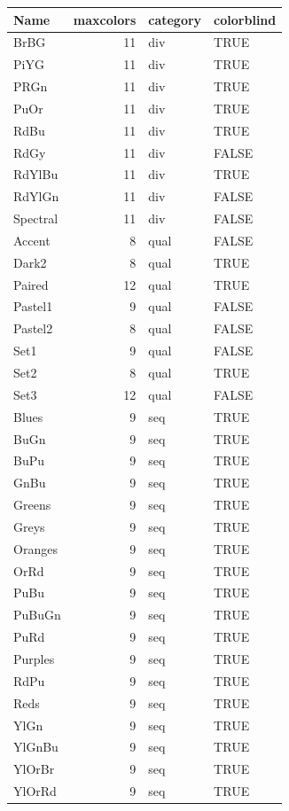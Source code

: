 \documentclass[12pt,]{book}
\makeatletter
\newenvironment{Shaded}{\begin{snugshade}}{\end{snugshade}}
\newcommand{\KeywordTok}[1]{\textcolor[rgb]{0.13,0.29,0.53}{\textbf{{#1}}}}
\newcommand{\DataTypeTok}[1]{\textcolor[rgb]{0.13,0.29,0.53}{{#1}}}
\newcommand{\StringTok}[1]{\textcolor[rgb]{0.31,0.60,0.02}{{#1}}}
\newcommand{\NormalTok}[1]{{#1}}
\newenvironment{kframe}{%
\medskip{}
\setlength{\fboxsep}{.8em}
 \def\at@end@of@kframe{}%
 \ifinner\ifhmode%
  \def\at@end@of@kframe{\end{minipage}}%
  \begin{minipage}{\columnwidth}%
 \fi\fi%
 \def\FrameCommand##1{\hskip\@totalleftmargin \hskip-\fboxsep
 \colorbox{shadecolor}{##1}\hskip-\fboxsep
     \hskip-\linewidth \hskip-\@totalleftmargin \hskip\columnwidth}%
 \MakeFramed {\advance\hsize-\width
   \@totalleftmargin\z@ \linewidth\hsize
   \@setminipage}}%
 {\par\unskip\endMakeFramed%
 \at@end@of@kframe}
\renewenvironment{Shaded}{\begin{kframe}}{\end{kframe}}
\makeatother
\begin{document}
\begin{Shaded}
\end{Shaded}

\begin{tabular}{l|r|l|l}
\hline
Name & maxcolors & category & colorblind\\
\hline
BrBG & 11 & div & TRUE\\
\hline
PiYG & 11 & div & TRUE\\
\hline
PRGn & 11 & div & TRUE\\
\hline
PuOr & 11 & div & TRUE\\
\hline
RdBu & 11 & div & TRUE\\
\hline
RdGy & 11 & div & FALSE\\
\hline
RdYlBu & 11 & div & TRUE\\
\hline
RdYlGn & 11 & div & FALSE\\
\hline
Spectral & 11 & div & FALSE\\
\hline
Accent & 8 & qual & FALSE\\
\hline
Dark2 & 8 & qual & TRUE\\
\hline
Paired & 12 & qual & TRUE\\
\hline
Pastel1 & 9 & qual & FALSE\\
\hline
Pastel2 & 8 & qual & FALSE\\
\hline
Set1 & 9 & qual & FALSE\\
\hline
Set2 & 8 & qual & TRUE\\
\hline
Set3 & 12 & qual & FALSE\\
\hline
Blues & 9 & seq & TRUE\\
\hline
BuGn & 9 & seq & TRUE\\
\hline
BuPu & 9 & seq & TRUE\\
\hline
GnBu & 9 & seq & TRUE\\
\hline
Greens & 9 & seq & TRUE\\
\hline
Greys & 9 & seq & TRUE\\
\hline
Oranges & 9 & seq & TRUE\\
\hline
OrRd & 9 & seq & TRUE\\
\hline
PuBu & 9 & seq & TRUE\\
\hline
PuBuGn & 9 & seq & TRUE\\
\hline
PuRd & 9 & seq & TRUE\\
\hline
Purples & 9 & seq & TRUE\\
\hline
RdPu & 9 & seq & TRUE\\
\hline
Reds & 9 & seq & TRUE\\
\hline
YlGn & 9 & seq & TRUE\\
\hline
YlGnBu & 9 & seq & TRUE\\
\hline
YlOrBr & 9 & seq & TRUE\\
\hline
YlOrRd & 9 & seq & TRUE\\
\hline
\end{tabular}
\end{document}
